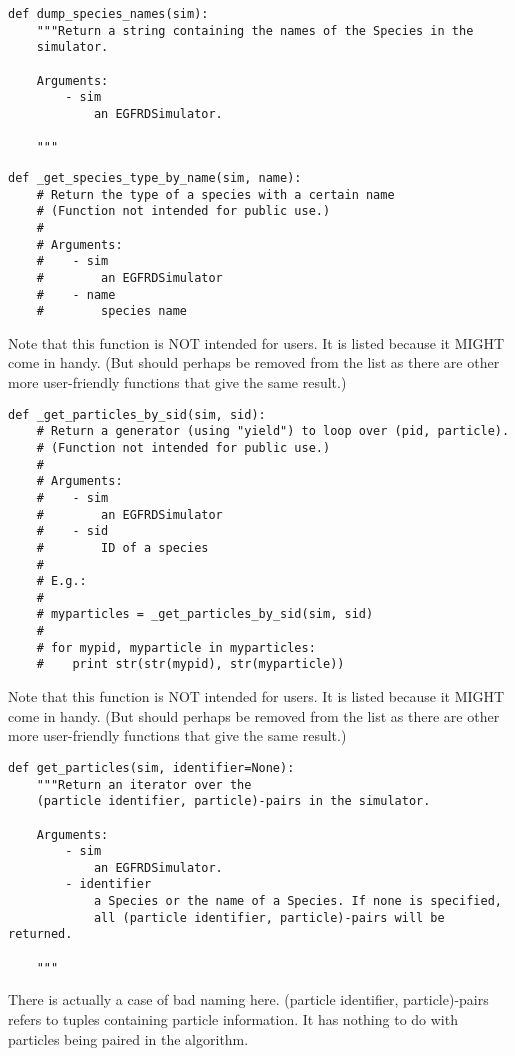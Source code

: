 \documentclass[a4paper,10pt]{article}
\begin{document}
\begin{verbatim}
def dump_species_names(sim):
    """Return a string containing the names of the Species in the 
    simulator.

    Arguments:
        - sim
            an EGFRDSimulator.

    """
\end{verbatim}

\begin{verbatim}
def _get_species_type_by_name(sim, name):
    # Return the type of a species with a certain name
    # (Function not intended for public use.)
    #
    # Arguments:
    #    - sim
    #        an EGFRDSimulator
    #    - name
    #        species name
\end{verbatim}
Note that this function is NOT intended for users. It is listed because it MIGHT come in handy. (But should perhaps be removed from the list as there are other more user-friendly functions that give the same result.)

\begin{verbatim}
def _get_particles_by_sid(sim, sid):
    # Return a generator (using "yield") to loop over (pid, particle).
    # (Function not intended for public use.)
    # 
    # Arguments:
    #    - sim
    #        an EGFRDSimulator
    #    - sid
    #        ID of a species
    #
    # E.g.:
    #
    # myparticles = _get_particles_by_sid(sim, sid)
    #
    # for mypid, myparticle in myparticles:
    #    print str(str(mypid), str(myparticle))
\end{verbatim}
Note that this function is NOT intended for users. It is listed because it MIGHT come in handy. (But should perhaps be removed from the list as there are other more user-friendly functions that give the same result.)

\begin{verbatim}
def get_particles(sim, identifier=None):
    """Return an iterator over the
    (particle identifier, particle)-pairs in the simulator.

    Arguments:
        - sim
            an EGFRDSimulator.
        - identifier
            a Species or the name of a Species. If none is specified, 
            all (particle identifier, particle)-pairs will be returned.

    """
\end{verbatim}
There is actually a case of bad naming here. (particle identifier, particle)-pairs refers to tuples containing particle information. It has nothing to do with particles being paired in the algorithm.
\end{document}
